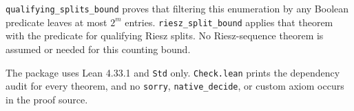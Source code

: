 \documentclass[11pt]{article}
\begin{document}
\verb|qualifying_splits_bound| proves that filtering this enumeration by any Boolean predicate leaves at most $2^m$ entries. \verb|riesz_split_bound| applies that theorem with the predicate for qualifying Riesz splits. No Riesz-sequence theorem is assumed or needed for this counting bound.

The package uses Lean 4.33.1 and \verb|Std| only. \verb|Check.lean| prints the dependency audit for every theorem, and no \verb|sorry|, \verb|native_decide|, or custom axiom occurs in the proof source.
\end{document}
